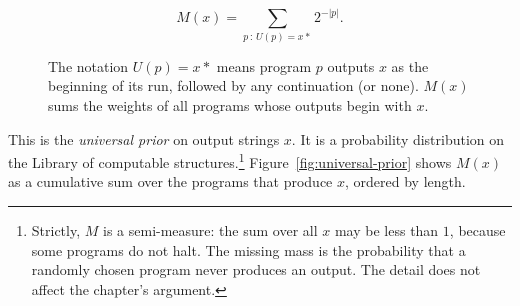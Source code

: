 $$M(x) = \sum_{p \,:\, U(p) = x*} 2^{-|p|}.$$

\begin{figure}[h]
\centering
{}
\caption{The notation $U(p) = x*$ means program $p$ outputs $x$ as the beginning of its run, followed by any continuation (or none). $M(x)$ sums the weights of all programs whose outputs begin with $x$.}
\label{fig:prefix}
\end{figure}

This is the \emph{universal prior} on output strings $x$. It is a probability distribution on the Library of computable structures.\footnote{Strictly, $M$ is a semi-measure: the sum over all $x$ may be less than $1$, because some programs do not halt. The missing mass is the probability that a randomly chosen program never produces an output. The detail does not affect the chapter's argument.} Figure~\ref{fig:universal-prior} shows $M(x)$ as a cumulative sum over the programs that produce $x$, ordered by length.

